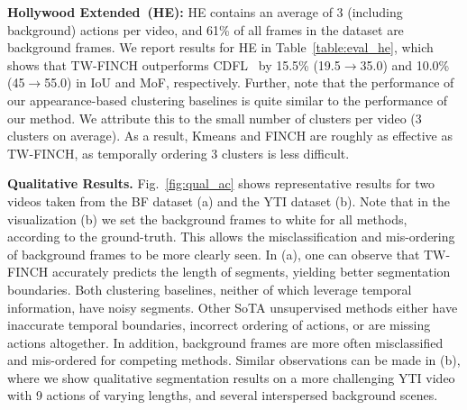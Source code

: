 \documentclass[10pt,twocolumn,letterpaper]{article}
\begin{document}
\noindent\textbf{Hollywood Extended~(HE):} HE contains an average of 3 (including background) actions per video, and 61\% of all frames in the dataset are background frames.  
We report results for HE in Table~\ref{table:eval_he}, which shows that TW-FINCH outperforms CDFL~\cite{cdfl} by 15.5\% (19.5$\rightarrow$35.0) and 10.0\% (45$\rightarrow$55.0) in IoU and MoF, respectively. Further, note that the performance of our appearance-based clustering baselines is quite similar to the performance of our method. We attribute this to the small number of clusters per video (3 clusters on average). As a result, Kmeans and FINCH are roughly as effective as TW-FINCH, as temporally ordering 3 clusters is less difficult.\\



\noindent\textbf{Qualitative Results.} Fig.~\ref{fig:qual_ac} shows representative results for two videos taken from the BF dataset (a) and the YTI dataset (b).
Note that in the visualization (b) we set the background frames to white for all methods, according to the ground-truth. This allows the misclassification and mis-ordering of background frames to be more clearly seen.
In (a), one can observe that TW-FINCH accurately predicts the length of segments, yielding better segmentation boundaries. Both clustering baselines, neither of which leverage temporal information, have noisy segments. Other SoTA unsupervised methods either have inaccurate temporal boundaries, incorrect ordering of actions, or are missing actions altogether. In addition, background frames are more often misclassified and mis-ordered for competing methods. Similar observations can be made in (b), where we show qualitative segmentation results on a more challenging YTI video with 9 actions of varying lengths, and several interspersed background scenes.\\
\end{document}

